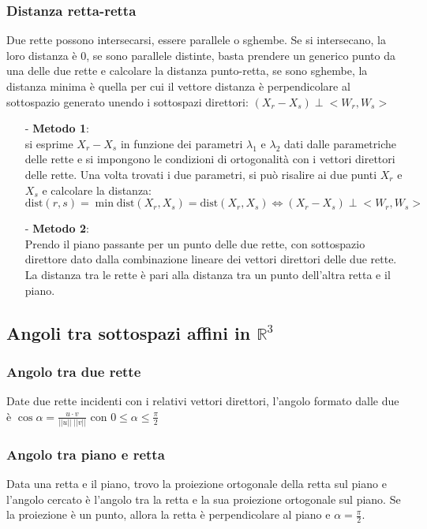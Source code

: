 \documentclass[a4paper]{article}
\newcommand\dist{\text{dist}}	%
\begin{document}
\subsubsection*{Distanza retta-retta}
Due rette possono intersecarsi, essere parallele o sghembe. Se si intersecano, la loro distanza è 0, se sono parallele distinte,
basta prendere un generico punto da una delle due rette e calcolare la distanza punto-retta, se sono sghembe, la distanza minima
è quella per cui il vettore distanza è perpendicolare al sottospazio generato unendo i sottospazi direttori: \((X_r-X_s) \perp <W_r, W_s>\)
\begin{itemize}[topsep=3pt, itemsep=0pt]
	\item[-] \textbf{Metodo 1}: \\
	si esprime \(X_r-X_s\) in funzione dei parametri \(\lambda_1\) e \(\lambda_2\) dati dalle parametriche delle rette e si impongono
	le condizioni di ortogonalità con i vettori direttori delle rette. Una volta trovati i due parametri, si può risalire ai due
	punti \(X_r\) e \(X_s\) e calcolare la distanza: \(\dist(r,s) = \min \dist(X_r, X_s) = \dist(X_r, X_s) \Leftrightarrow (X_r-X_s) \perp <W_r, W_s>\)
	\item[-] \textbf{Metodo 2}: \\
	Prendo il piano passante per un punto delle due rette, con sottospazio direttore dato dalla combinazione lineare dei vettori
	direttori delle due rette. La distanza tra le rette è pari alla distanza tra un punto dell'altra retta e il piano.
\end{itemize}

\subsection{Angoli tra sottospazi affini in \(\mathbb{R}^3\)}
\subsubsection*{Angolo tra due rette}
Date due rette incidenti con i relativi vettori direttori, l'angolo formato dalle due è \(\displaystyle \cos \alpha = \frac{u \cdot v}{||u|| \; ||v||}\)
con \(0 \leq \alpha \leq \frac{\pi}{2}\)

\subsubsection*{Angolo tra piano e retta}
Data una retta e il piano, trovo la proiezione ortogonale della retta sul piano e l'angolo cercato è l'angolo tra la retta e la sua
proiezione ortogonale sul piano. Se la proiezione è un punto, allora la retta è perpendicolare al piano e \(\alpha = \frac{\pi}{2}\).
\end{document}
